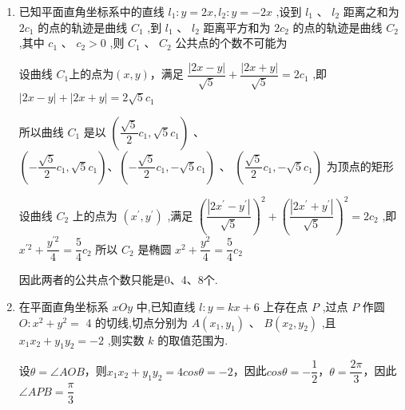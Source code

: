 \begin{enumerate}
\begin{jieda}
        数形结合可知直线$l$的倾斜角$\theta$应满足$\ang{15} \leq \theta \leq \ang{75}$或$\ang{115} \leq \theta \leq \ang{175}$，因此$k = \tan\theta \in [-2-\sqrt{3}, -2+\sqrt{3}] \cup [2-\sqrt{3}, 2+\sqrt{3}]$
    \end{jieda}
    \item 已知平面直角坐标系中的直线 ${l}_{1} : y = {2x},{l}_{2} : y =  - {2x}$ ,设到 ${l}_{1}\text{ 、 }{l}_{2}$ 距离之和为 $2{c}_{1}$ 的点的轨迹是曲线 ${C}_{1}$ ,到 ${l}_{1}$ 、 ${l}_{2}$ 距离平方和为 $2{c}_{2}$ 的点的轨迹是曲线 ${C}_{2}$ ,其中 ${c}_{1}\text{ 、 }{c}_{2} > 0$ ,则 ${C}_{1}$ 、 ${C}_{2}$ 公共点的个数不可能为 
    \begin{jieda}
        设曲线 ${C}_{1}$上的点为$(x,y)$，满足 $\dfrac{\left| 2x - y\right| }{\sqrt{5}} + \dfrac{\left| 2x + y\right| }{\sqrt{5}} = 2{c}_{1}$ ,即
        $\left| {{2x} - y}\right|  + \left| {{2x} + y}\right|  = 2\sqrt{5}{c}_{1}$
        所以曲线 ${C}_{1}$ 是以 $\left( {\dfrac{\sqrt{5}}{2}{c}_{1},\sqrt{5}{c}_{1}}\right)$ 、
        $\left( {-\dfrac{\sqrt{5}}{2}{c}_{1},\sqrt{5}{c}_{1}}\right) \text{、}\left( {-\dfrac{\sqrt{5}}{2}{c}_{1}, - \sqrt{5}{c}_{1}}\right)$ 、
        $\left( {\dfrac{\sqrt{5}}{2}{c}_{1}, - \sqrt{5}{c}_{1}}\right)$ 为顶点的矩形
        
        设曲线 ${C}_{2}$ 上的点为 $\left( {{x}^{\prime },{y}^{\prime }}\right)$ ,满足
        ${\left( \dfrac{\left| 2{x}^{\prime } - {y}^{\prime }\right| }{\sqrt{5}}\right) }^{2} + {\left( \dfrac{\left| 2{x}^{\prime } + {y}^{\prime }\right| }{\sqrt{5}}\right) }^{2} = 2{c}_{2}$ ,即
        ${x}^{\prime 2} + \dfrac{{y}^{\prime 2}}{4} = \dfrac{5}{4}{c}_{2}$
        所以 ${C}_{2}$ 是椭圆 ${x}^{2} + \dfrac{{y}^{2}}{4} = \dfrac{5}{4}{c}_{2}$ 

        因此两者的公共点个数只能是0、4、8个.
    \end{jieda}
    \item 在平面直角坐标系 ${xOy}$ 中,已知直线 $l : y = {kx} + 6$ 上存在点 $P$ ,过点 $P$ 作圆 $O : {x}^{2} + {y}^{2} =$ 4 的切线,切点分别为 $A\left( {{x}_{1},{y}_{1}}\right)$ 、 $B\left( {{x}_{2},{y}_{2}}\right)$ ,且 ${x}_{1}{x}_{2} + {y}_{1}{y}_{2} =  - 2$ ,则实数 $k$ 的取值范围为\blkda[5]{$\left(-\infty, -\dfrac{\sqrt{5}}{2}\right] \cup \left[\dfrac{\sqrt{5}}{2}, +\infty\right)$}.
    \begin{jieda}
        设$\theta = \angle{AOB}$，则${x}_{1}{x}_{2} + {y}_{1}{y}_{2} = 4cos\theta = -2$，因此$cos\theta = -\dfrac{1}{2}$，$\theta = \dfrac{2\pi}{3}$，因此$\angle{APB} = \dfrac{\pi}{3}$


\end{jieda}
\end{enumerate}
